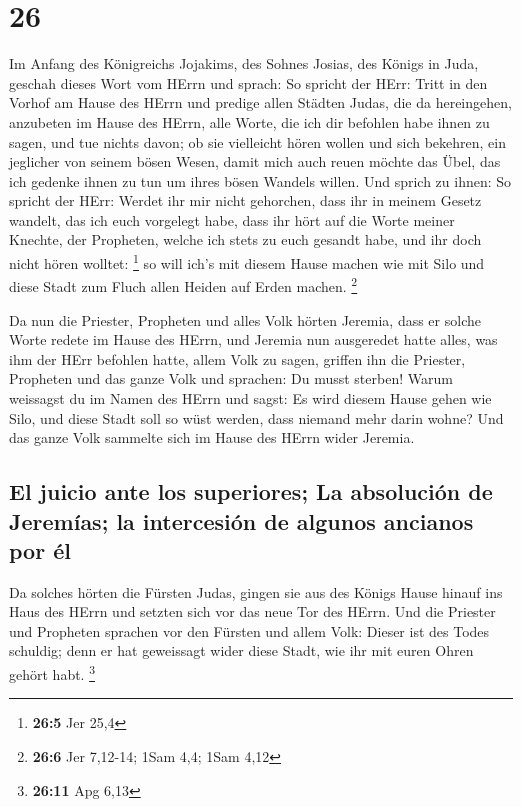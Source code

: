 \hypertarget{section-25}{%
\section{26}\label{section-25}}

 Im Anfang des Königreichs Jojakims, des Sohnes Josias,
des Königs in Juda, geschah dieses Wort vom HErrn und sprach:
 So spricht der HErr: Tritt in den Vorhof am Hause des
HErrn und predige allen Städten Judas, die da hereingehen, anzubeten im
Hause des HErrn, alle Worte, die ich dir befohlen habe ihnen zu sagen,
und tue nichts davon;  ob sie vielleicht hören wollen und
sich bekehren, ein jeglicher von seinem bösen Wesen, damit mich auch
reuen möchte das Übel, das ich gedenke ihnen zu tun um ihres bösen
Wandels willen.  Und sprich zu ihnen: So spricht der HErr:
Werdet ihr mir nicht gehorchen, dass ihr in meinem Gesetz wandelt, das
ich euch vorgelegt habe,  dass ihr hört auf die Worte
meiner Knechte, der Propheten, welche ich stets zu euch gesandt habe,
und ihr doch nicht hören wolltet: \footnote{\textbf{26:5} Jer 25,4}
 so will ich's mit diesem Hause machen wie mit Silo und
diese Stadt zum Fluch allen Heiden auf Erden machen. \footnote{\textbf{26:6}
  Jer 7,12-14; 1Sam 4,4; 1Sam 4,12}

 Da nun die Priester, Propheten und alles Volk hörten
Jeremia, dass er solche Worte redete im Hause des HErrn, 
und Jeremia nun ausgeredet hatte alles, was ihm der HErr befohlen hatte,
allem Volk zu sagen, griffen ihn die Priester, Propheten und das ganze
Volk und sprachen: Du musst sterben!  Warum weissagst du
im Namen des HErrn und sagst: Es wird diesem Hause gehen wie Silo, und
diese Stadt soll so wüst werden, dass niemand mehr darin wohne? Und das
ganze Volk sammelte sich im Hause des HErrn wider Jeremia.

\hypertarget{el-juicio-ante-los-superiores-la-absoluciuxf3n-de-jeremuxedas-la-intercesiuxf3n-de-algunos-ancianos-por-uxe9l}{%
\subsection{El juicio ante los superiores; La absolución de Jeremías; la
intercesión de algunos ancianos por
él}\label{el-juicio-ante-los-superiores-la-absoluciuxf3n-de-jeremuxedas-la-intercesiuxf3n-de-algunos-ancianos-por-uxe9l}}

 Da solches hörten die Fürsten Judas, gingen sie aus des
Königs Hause hinauf ins Haus des HErrn und setzten sich vor das neue Tor
des HErrn.  Und die Priester und Propheten sprachen vor
den Fürsten und allem Volk: Dieser ist des Todes schuldig; denn er hat
geweissagt wider diese Stadt, wie ihr mit euren Ohren gehört habt.
\footnote{\textbf{26:11} Apg 6,13}

